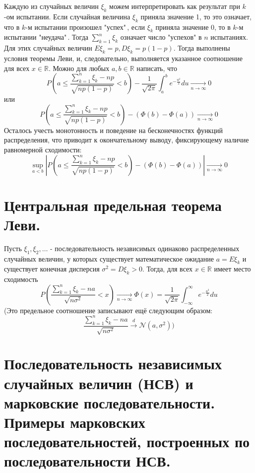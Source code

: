 Каждую из случайных величин $\xi_k$ можем интерпретировать как результат при $k$-ом испытании. Если случайная величина $\xi_k$ приняла значение 1, то это означает, что в $k$-м испытании произошел "успех"\,, если $\xi_k$ приняла значение 0, то в $k$-м испытании "неудача"\,. Тогда $\sum\limits_{k=1}^{n} \xi_k$ означает число "успехов" в $n$ испытаниях. Для этих случайных величин $E\xi_k = p, D\xi_k = p(1-p)$. Тогда выполнены условия теоремы Леви, и, следовательно, выполняется указанное соотношение для всех $x \in \mathbb{R}$. Можно для любых $a, b \in \mathbb{R}$ написать, что
\[ P \left( a \le \frac{\sum\limits_{k=1}^{n} \xi_k - np}{\sqrt{np (1-p)}} < b \right) - \frac{1}{\sqrt{2 \pi}} \int_{a}^{b} e^{- \frac{u^2}{2}} du \underset{n \to \infty}{\to} 0 \]
или
\[ P \left( a \le \frac{\sum\limits_{k=1}^{n} \xi_k - np}{\sqrt{np (1-p)}} < b \right) - (\Phi(b) - \Phi(a)) \underset{n \to \infty}{\to} 0 \]
Осталось учесть монотонность и поведение на бесконечностях функций распределения, что приводит к окончательному выводу, фиксирующему наличие равномерной сходимости:
\[ \sup_{a < b} \left| P \left( a \le \frac{\sum\limits_{k=1}^{n} \xi_k - np}{\sqrt{np (1-p)}} < b \right) - (\Phi(b) - \Phi(a)) \right| \underset{n \to \infty}{\to} 0 \]

\section{Центральная предельная теорема Леви.}

Пусть $\xi_1, \xi_2, \dots$ - последовательность независимых одинаково распределенных случайных величин, у которых существует математическое ожидание $a = E\xi_k$ и существует конечная дисперсия $\sigma^2 = D\xi_k > 0$. Тогда, для всех $x \in \mathbb{R}$ имеет место сходимость
\[ P \left( \frac{\sum\limits_{k=1}^{n} \xi_k - na}{\sqrt{n \sigma^2}} < x \right) \underset{n \to \infty}{\to} \Phi (x) = \frac{1}{\sqrt{2 \pi}} \int_{- \infty}^{\infty} e^{- \frac{u^2}{2}}du \]
(Это предельное соотношение записывают ещё следующим образом:
\[ \frac{\sum\limits_{k=1}^{n} \xi_k - na}{\sqrt{n \sigma^2}} \overset{d}{\to} \mathcal{N} (a, \sigma^2) ) \]

\section{Последовательность независимых случайных величин (НСВ) и марковские последовательности. Примеры марковских последовательностей, построенных по последовательности НСВ.}

